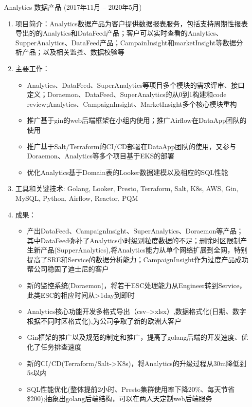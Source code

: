 \documentclass{resume}
\begin{document}
Analytics 数据产品 (2017年11月 -- 2020年5月)
\begin{enumerate}
  \item 项目简介：Analytics数据产品为客户提供数据报表服务，包括支持周期性报表导出的的Analytics和DataFeed产品；客户可以实时查看的Analytics、SupperAnalytics、DataFeed产品；CampainInsight和marketInsight等数据分析产品；以及相关监控、数据校验等
  \item 主要工作：
    \begin{itemize}
      \item Analytics、DataFeed、SuperAnalytics等项目多个模块的需求评审、接口定义；Doraemon、DataFeed、SuperAnalytics的从0到1构建和code review;Analytics、CampaignInsight、MarketInsight多个核心模块重构
      \item 推广基于gin的web后端框架在小组内使用；推广Airflow在DataApp团队的使用
      \item 推广基于Salt/Terraform的CI/CD部署在DataApp团队的使用，又参与Doraemon、Analytics等多个项目基于EKS的部署
      \item 优化Analytics基于Domain表的Looker数据建模以及相应的SQL性能
    \end{itemize}
  \item 工具和关键技术: Golang, Looker, Presto, Terraform, Salt, K8s, AWS, Gin, MySQL, Python, Airflow, Reactor, PQM
  \item 成果：
    \begin{itemize}
      \item 产出DataFeed、CampaignInsight、SuperAnalytics、Doraemon等产品；其中DataFeed弥补了Analytics小时级别粒度数据的不足；删除时区限制产生新产品(SupperAnalytics),将Analytics能力从单个网络扩展到全网，特别提高了SRE和Service的数据分析能力；CampaignInsight作为过度产品成功帮公司稳固了迪士尼的客户
      \item 新的监控系统(Doraemon)，将若干ESC处理能力从Engineer转到Service，此类ESC的相应时间从>1day到即时
      \item Analytics核心功能开发多格式导出（csv-->xlsx）,数据格式化(日期、数字根据不同时区格式化),为公司争取了新的欧洲大客户
      \item Gin框架的推广以及规范的制定和推广，提高了golang后端的开发速度、优化了任务排查速度
      \item 新的CI/CD(Terraform/Salt->K8s)，将Analytics的升级过程从30m降低到5s以内
      \item SQL性能优化(整体提前2小时、Presto集群使用率下降20\%、每天节省\$200);抽象出golang后端结构，可以在两人天定制web后端服务
    \end{itemize}
\end{enumerate}
\end{document}

